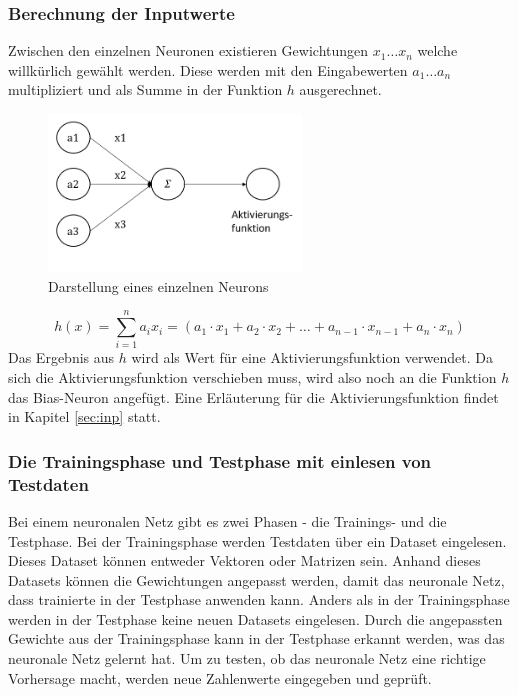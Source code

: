 \subsubsection{Berechnung der Inputwerte}
Zwischen den einzelnen Neuronen existieren Gewichtungen  \(x_1 \dots x_n\) welche willkürlich gewählt werden. Diese werden mit den Eingabewerten  \(a_1 \dots a_n\) multipliziert und als Summe in der Funktion \(h\) ausgerechnet.
\newline

\begin{figure}[H]
	\centering
		\includegraphics[width=0.6\textwidth]{images/h_nn.png}
	\caption{Darstellung eines einzelnen Neurons}
	\label{fig:h_nn}
\end{figure}

\[\displaystyle h(x)=\sum_{i=1}^{n} a_i x_i = (a_1 \cdot x_1 + a_2 \cdot x_2 + \dots + a_{n-1} \cdot x_{n-1} + a_n \cdot x_n)\]
\newline
Das Ergebnis aus \(h\) wird als Wert für eine Aktivierungsfunktion verwendet. Da sich die Aktivierungsfunktion verschieben muss, wird also noch an die Funktion \(h\) das Bias-Neuron angefügt. Eine Erläuterung für die Aktivierungsfunktion findet in Kapitel \ref{sec:inp} statt.

\subsubsection{Die Trainingsphase und Testphase mit einlesen von Testdaten}
Bei einem neuronalen Netz gibt es zwei Phasen - die Trainings- und die Testphase. Bei der Trainingsphase werden Testdaten über ein Dataset eingelesen. Dieses Dataset können entweder Vektoren oder Matrizen sein. Anhand dieses Datasets können die Gewichtungen angepasst werden, damit das neuronale Netz, dass trainierte in der Testphase anwenden kann.
\newline
Anders als in der Trainingsphase werden in der Testphase keine neuen Datasets eingelesen. Durch die angepassten Gewichte aus der Trainingsphase kann in der Testphase erkannt werden, was das neuronale Netz gelernt hat. Um zu testen, ob das neuronale Netz eine richtige Vorhersage macht, werden neue Zahlenwerte eingegeben und geprüft.

